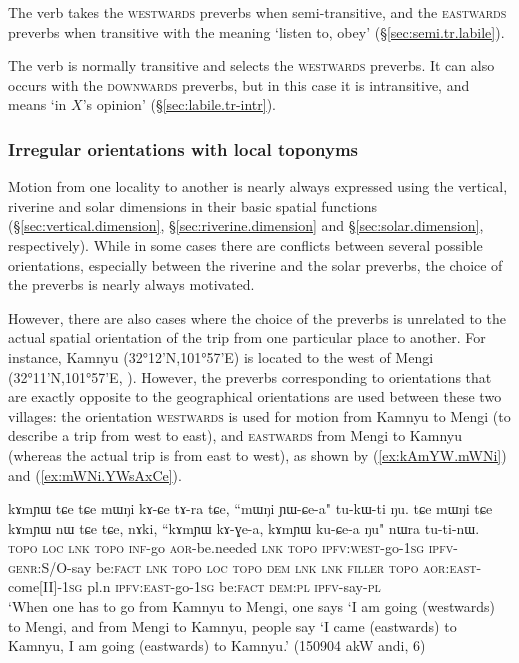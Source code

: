 The verb  takes the \textsc{westwards} preverbs when semi-transitive, and the \textsc{eastwards} preverbs when transitive with the meaning `listen to, obey' (§\ref{sec:semi.tr.labile}).  

The verb  is normally transitive and selects the \textsc{westwards} preverbs. It can also occurs with the \textsc{downwards} preverbs, but in this case it is intransitive, and means `in $X$'s opinion' (§\ref{sec:labile.tr-intr}). 

\subsubsection{Irregular orientations with local toponyms} \label{sec:local.toponyms.orientation}
Motion from one locality to another is nearly always expressed using the vertical, riverine and solar dimensions in their basic spatial functions (§\ref{sec:vertical.dimension}, §\ref{sec:riverine.dimension} and §\ref{sec:solar.dimension}, respectively). While in some cases there are conflicts between several possible orientations, especially between the riverine and the solar preverbs, the choice of the preverbs is nearly always motivated.

However, there are also cases where the choice of the preverbs is unrelated to the actual spatial orientation of the trip from one particular place to another. For instance, Kamnyu  (32°12'N,101°57'E) is located to the west of Mengi  (32°11'N,101°57'E, ). %
However, the preverbs corresponding to orientations that are exactly opposite to the geographical orientations are used between these two villages: the orientation \textsc{westwards} is used for motion from Kamnyu to Mengi (to describe a trip from west to east), and \textsc{eastwards} from Mengi to Kamnyu (whereas the actual trip is from east to west), as shown by (\ref{ex:kAmYW.mWNi}) and (\ref{ex:mWNi.YWsAxCe}).

\begin{exe}
\ex \label{ex:kAmYW.mWNi}
\gll kɤmɲɯ tɕe tɕe mɯŋi kɤ-ɕe tɤ-ra tɕe, ``mɯŋi ɲɯ-ɕe-a" tu-kɯ-ti ŋu.
tɕe mɯŋi tɕe kɤmɲɯ nɯ tɕe tɕe, nɤki, ``kɤmɲɯ kɤ-ɣe-a, kɤmɲɯ ku-ɕe-a ŋu" nɯra tu-ti-nɯ. \\
\textsc{topo} \textsc{loc} \textsc{lnk}  \textsc{topo} \textsc{inf}-go \textsc{aor}-be.needed \textsc{lnk}  \textsc{topo} \textsc{ipfv}:\textsc{west}-go-\textsc{1sg} \textsc{ipfv}-\textsc{genr}:S/O-say be:\textsc{fact} \textsc{lnk}  \textsc{topo} \textsc{loc}  \textsc{topo} \textsc{dem} \textsc{lnk} \textsc{lnk} \textsc{filler}  \textsc{topo} \textsc{aor}:\textsc{east}-come[II]-\textsc{1sg} pl.n \textsc{ipfv}:\textsc{east}-go-\textsc{1sg} be:\textsc{fact} \textsc{dem}:\textsc{pl} \textsc{ipfv}-say-\textsc{pl} \\
\glt `When one has to go from Kamnyu to Mengi, one says `I am going (westwards) to Mengi, and from Mengi to Kamnyu, people say `I came (eastwards)  to Kamnyu, I am going (eastwards) to Kamnyu.' (150904 akW andi, 6)
\end{exe}

